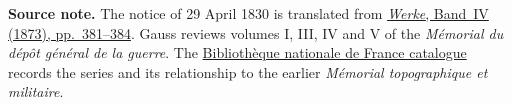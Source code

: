 \par\medskip\begin{small}\noindent\textbf{Source note.} The notice of 29 April 1830 is translated from \href{https://gdz.sub.uni-goettingen.de/id/PPN236005081}{\textit{Werke}, Band~IV (1873), pp.~381--384}. Gauss reviews volumes I, III, IV and V of the \textit{Mémorial du dépôt général de la guerre}. The \href{https://catalogue.bnf.fr/ark:/12148/cb422589596}{Bibliothèque nationale de France catalogue} records the series and its relationship to the earlier \textit{Mémorial topographique et militaire}.\par\end{small}
